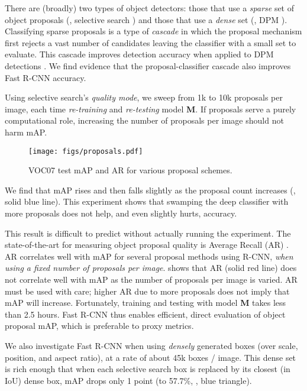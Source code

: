 \documentclass[10pt,twocolumn,letterpaper]{article}
\newcommand{\Med}{{\bf M}\xspace}
\begin{document}
There are (broadly) two types of object detectors: those that use a \emph{sparse} set of object proposals (\eg, selective search \cite{UijlingsIJCV2013}) and those that use a \emph{dense} set (\eg, DPM \cite{lsvm-pami}).
Classifying sparse proposals is a type of \emph{cascade} \cite{Viola01} in which the proposal mechanism first rejects a vast number of candidates leaving the classifier with a small set to evaluate.
This cascade improves detection accuracy when applied to DPM detections \cite{UijlingsIJCV2013}.
We find evidence that the proposal-classifier cascade also improves Fast R-CNN accuracy.

Using selective search's \emph{quality mode}, we sweep from 1k to 10k proposals per image, each time \emph{re-training} and \emph{re-testing} model \Med.
If proposals serve a purely computational role, increasing the number of proposals per image should not harm mAP.
\begin{figure}[h!]
\centering
\texttt{[image: figs/proposals.pdf]}
\caption{VOC07 test mAP and AR for various proposal schemes.}
\end{figure}

We find that  mAP rises and then falls slightly as the proposal count increases (, solid blue line).
This experiment shows that swamping the deep classifier with more proposals does not help, and even slightly hurts, accuracy.

This result is difficult to predict without actually running the experiment.
The state-of-the-art for measuring object proposal quality is Average Recall (AR) \cite{Hosang15proposals}.
AR correlates well with mAP for several proposal methods using R-CNN, \emph{when using a fixed number of proposals per image}.
 shows that AR (solid red line) does not correlate well with mAP as the number of proposals per image is varied.
AR must be used with care; higher AR due to more proposals does not imply that mAP will increase.
Fortunately, training and testing with model \Med takes less than 2.5 hours.
Fast R-CNN thus enables efficient, direct evaluation of object proposal mAP, which is preferable to proxy metrics.


We also investigate Fast R-CNN when using \emph{densely} generated boxes (over scale, position, and aspect ratio), at a rate of about 45k boxes / image.
This dense set is rich enough that when each selective search box is replaced by its closest (in IoU) dense box, mAP drops only 1 point (to 57.7\%, , blue triangle).
\end{document}
